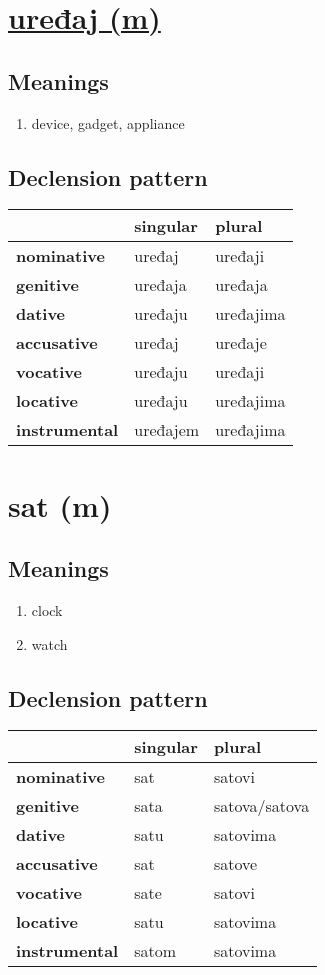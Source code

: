 \filbreak
\section{\underline{uređaj (m)}}
\subsection*{Meanings}
\begin{enumerate}
\item device, gadget, appliance
\end{enumerate}
\subsection*{Declension pattern}
\begin{tabularx}{\linewidth}{Xll}
\toprule
{} &  singular &     plural \\
\midrule
\textbf{nominative  } &    uređaj &    uređaji \\
\textbf{genitive    } &   uređaja &    uređaja \\
\textbf{dative      } &   uređaju &  uređajima \\
\textbf{accusative  } &    uređaj &    uređaje \\
\textbf{vocative    } &   uređaju &    uređaji \\
\textbf{locative    } &   uređaju &  uređajima \\
\textbf{instrumental} &  uređajem &  uređajima \\
\bottomrule
\end{tabularx}

\filbreak
\section{sat (m)}
\subsection*{Meanings}
\begin{enumerate}
\item clock
\item watch
\end{enumerate}
\subsection*{Declension pattern}
\begin{tabularx}{\linewidth}{Xll}
\toprule
{} & singular &           plural \\
\midrule
\textbf{nominative  } &      sat &          satovi \\
\textbf{genitive    } &     sata &  satova/satova \\
\textbf{dative      } &     satu &        satovima \\
\textbf{accusative  } &      sat &          satove \\
\textbf{vocative    } &     sate &          satovi \\
\textbf{locative    } &     satu &        satovima \\
\textbf{instrumental} &    satom &        satovima \\
\bottomrule
\end{tabularx}

